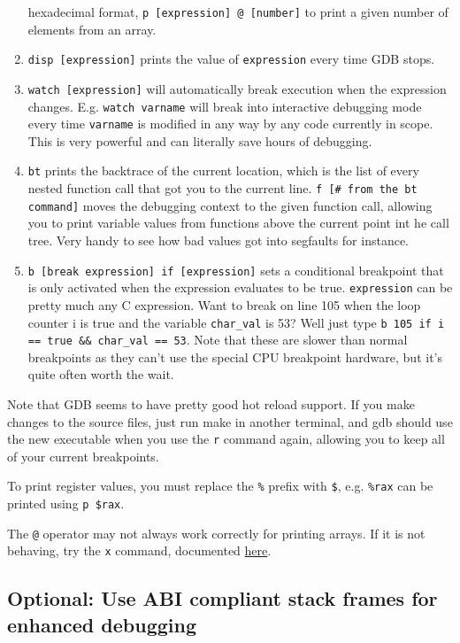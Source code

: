 \documentclass[11pt]{article}
\begin{document}
\begin{enumerate}
        hexadecimal format, \texttt{p [expression] @ [number]} to print a given number of
        elements from an array.
    \item \texttt{disp [expression]} prints the value of \texttt{expression} every time
        GDB stops.
    \item \texttt{watch [expression]} will automatically break execution when the
        expression changes. E.g. \texttt{watch varname} will break into interactive
        debugging mode every time \texttt{varname} is modified in any way by any code
        currently in scope. This is very powerful and can literally save hours of
        debugging.
    \item \texttt{bt} prints the backtrace of the current location, which is the list of
        every nested function call that got you to the current line. \texttt{f [\# from the
        bt command]} moves the debugging context to the given function call, allowing you
        to print variable values from functions above the current point int he call tree.
        Very handy to see how bad values got into segfaults for instance.
    \item \texttt{b [break expression] if [expression]} sets a conditional breakpoint that
        is only activated when the expression evaluates to be true. \texttt{expression}
        can be pretty much any C expression. Want to break on line 105 when the loop
        counter i is true and the variable \texttt{char\_val} is 53? Well just type
        \texttt{b 105 if i == true \&\& char\_val == 53}. Note that these are slower than
        normal breakpoints as they can't use the special CPU breakpoint hardware, but it's
        quite often worth the wait.
\end{enumerate}

Note that GDB seems to have pretty good hot reload support. If you make changes to the
source files, just run make in another terminal, and gdb should use the new executable
when you use the \texttt{r} command again, allowing you to keep all of your current
breakpoints.

To print register values, you must replace the \texttt{\%} prefix with \texttt{\$}, e.g.
\texttt{\%rax} can be printed using \texttt{p \$rax}.

The \texttt{@} operator may not always work correctly for printing arrays. If it is not
behaving, try the \texttt{x} command, documented
\href{https://visualgdb.com/gdbreference/commands/x}{here}.

\subsection{Optional: Use ABI compliant stack frames for enhanced debugging}
\end{document}

